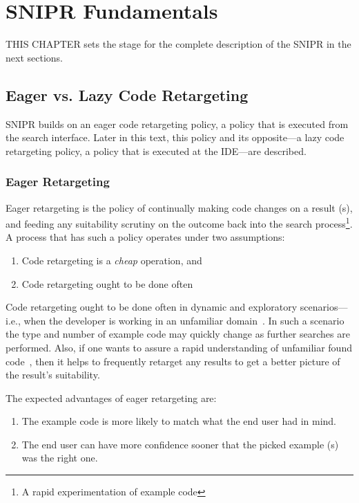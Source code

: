 \chapter{\uppercase{SnipR} Fundamentals}{}
\label{sec:fundamentals}


\lettrine[lraise=0.1, nindent=0em, slope=-.5em]{T} {HIS CHAPTER} sets the stage for the complete description of the \uppercase{SnipR} in the next sections.

\section{Eager vs. Lazy Code Retargeting}
\label{sec:eagervslazy}

\uppercase{SnipR} builds on an eager code retargeting policy, a policy that is executed from the search interface. Later in this text, this policy and its opposite---a lazy code retargeting policy, a policy that is executed at the IDE---are described.

\subsection{Eager Retargeting}

Eager retargeting is the policy of continually making code changes on a result (s), and feeding any suitability scrutiny on the outcome back into the search process\footnote{A rapid experimentation of example code}. A process that has such a policy operates under two assumptions:

\begin{enumerate}
	\item Code retargeting is a \emph{cheap} operation, and
	\item Code retargeting ought to be done often
\end{enumerate}

Code retargeting ought to be done often in dynamic and exploratory scenarios---i.e., when the developer is working in an unfamiliar domain~\cite{Brandt:2009ew}. In such a scenario the type and number of example code may quickly change as further searches are performed. Also, if one wants to assure a rapid understanding of unfamiliar found code~\cite{Brandt:2009ew}, then it helps to frequently retarget any results to get a better picture of the result's suitability.

The expected advantages of eager retargeting are:

\begin{enumerate}
	\item The example code is more likely to match what the end user had in mind.
	\item The end user can have more confidence sooner that the picked example (s) was the right one.
\end{enumerate}


